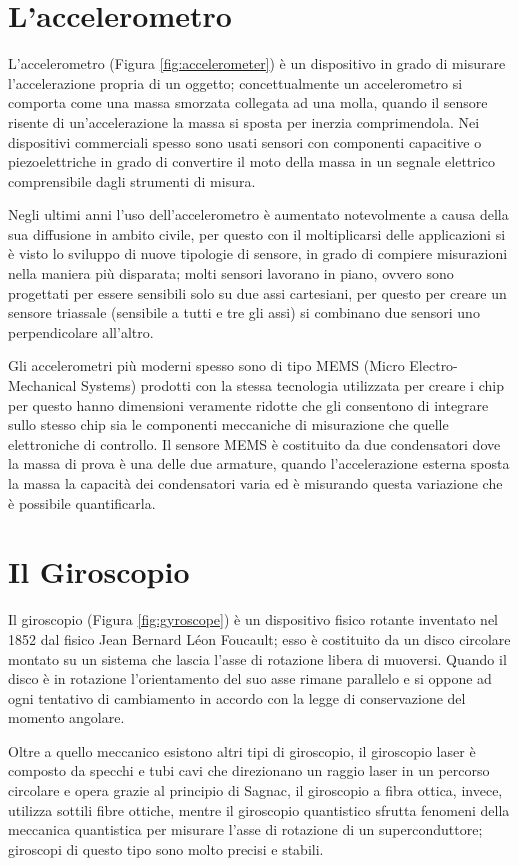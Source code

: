 \section{L'accelerometro}
L'accelerometro (Figura \ref{fig:accelerometer}) è un dispositivo in grado di misurare l'accelerazione propria di un oggetto; concettualmente un accelerometro si comporta come una massa smorzata collegata ad una molla, quando il sensore risente di un'accelerazione la massa si sposta per inerzia comprimendola. Nei dispositivi commerciali spesso sono usati sensori con componenti capacitive o piezoelettriche in grado di convertire il moto della massa in un segnale elettrico comprensibile dagli strumenti di misura.

Negli ultimi anni l'uso dell'accelerometro è aumentato notevolmente a causa della sua diffusione in ambito civile, per questo con il moltiplicarsi delle applicazioni si è visto lo sviluppo di nuove tipologie di sensore, in grado di compiere misurazioni nella maniera più disparata; molti sensori lavorano in piano, ovvero sono progettati per essere sensibili solo su due assi cartesiani, per questo per creare un sensore triassale (sensibile a tutti e tre gli assi) si combinano due sensori uno perpendicolare all'altro.

Gli accelerometri più moderni spesso sono di tipo MEMS (Micro Electro-Mechanical Systems) prodotti con la stessa tecnologia utilizzata per creare i chip per questo hanno dimensioni veramente ridotte che gli consentono di integrare sullo stesso chip sia le componenti meccaniche di misurazione che quelle elettroniche di controllo. Il sensore MEMS è costituito da due condensatori dove la massa di prova è una delle due armature, quando l'accelerazione esterna sposta la massa la capacità dei condensatori varia ed è misurando questa variazione che è possibile quantificarla.

\section{Il Giroscopio}
Il giroscopio (Figura \ref{fig:gyroscope}) è un dispositivo fisico rotante inventato nel 1852 dal fisico Jean Bernard Léon Foucault; esso è costituito da un disco circolare montato su un sistema che lascia l'asse di rotazione libera di muoversi. Quando il disco è in rotazione l'orientamento del suo asse rimane parallelo e si oppone ad ogni tentativo di cambiamento in accordo con la legge di conservazione del momento angolare.

Oltre a quello meccanico esistono altri tipi di giroscopio, il giroscopio laser è composto da specchi e tubi cavi che direzionano un raggio laser in un percorso circolare e opera grazie al principio di Sagnac, il giroscopio a fibra ottica, invece, utilizza sottili fibre ottiche, mentre il giroscopio quantistico sfrutta fenomeni della meccanica quantistica per misurare l'asse di rotazione di un superconduttore; giroscopi di questo tipo sono molto precisi e stabili.

